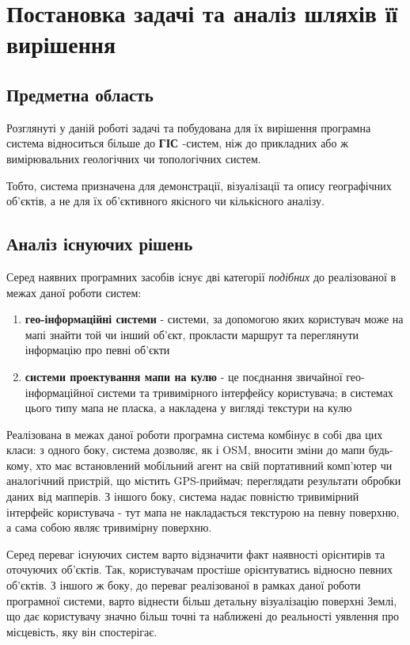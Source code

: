 \documentclass[simple,a4paper,14pt,ukrainian,utf8]{eskdtext}
\begin{document}
\clearpage \newpage \section{Постановка задачі та аналіз шляхів її вирішення}

	\subsection{Предметна область}
	
	Розглянуті у даній роботі задачі та побудована для їх вирішення програмна система відноситься більше до \textbf{ГІС \cite{website:gis}}-систем, ніж до прикладних або ж вимірювальних геологічних чи топологічних систем.
	
	Тобто, система призначена для демонстрації, візуалізації та опису географічних об’єктів, а не для їх об’єктивного якісного чи кількісного аналізу.
	
	\subsection{Аналіз існуючих рішень}
	
	Серед наявних програмних засобів існує дві категорії \textit{подібних} до реалізованої в межах даної роботи систем:
	
	\begin{enumerate}
		\item \textbf{гео-інформаційні системи} - системи, за допомогою яких користувач може на мапі знайти той чи інший об’єкт, прокласти маршрут та переглянути інформацію про певні об’єкти
		\item \textbf{системи проектування мапи на кулю} - це поєднання звичайної гео-інформаційної системи та тривимірного інтерфейсу користувача; в системах цього типу мапа не пласка, а накладена у вигляді текстури на кулю
	\end{enumerate}
	
	Реалізована в межах даної роботи програмна система комбінує в собі два цих класи: з одного боку, система дозволяє, як і OSM, вносити зміни до мапи будь-кому, хто має встановлений мобільний агент на свій портативний комп’ютер чи аналогічний пристрій, що містить GPS-приймач; переглядати результати обробки даних від мапперів. З іншого боку, система надає повністю тривимірний інтерфейс користувача - тут мапа не накладається текстурою на певну поверхню, а сама собою являє тривимірну поверхню.
	
	Серед переваг існуючих систем варто відзначити факт наявності орієнтирів та оточуючих об’єктів. Так, користувачам простіше орієнтуватись відносно певних об’єктів. З іншого ж боку, до переваг реалізованої в рамках даної роботи програмної системи, варто віднести більш детальну візуалізацію поверхні Землі, що дає користувачу значно більш точні та наближені до реальності уявлення про місцевість, яку він спостерігає.
	
\end{document}
